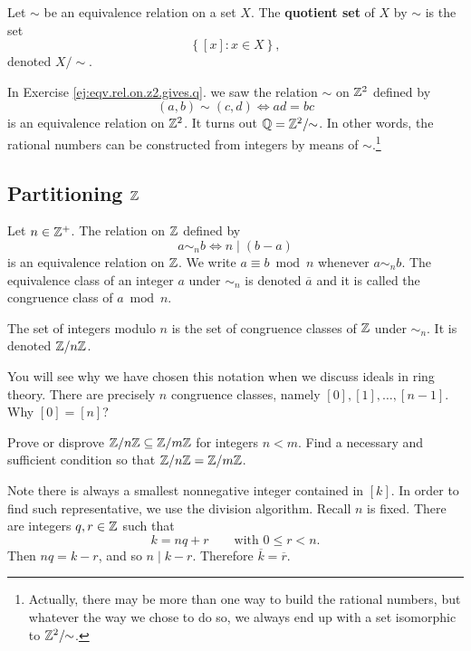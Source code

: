 \documentclass[11pt,a4paper]{article}
\begin{document}
\begin{defi}
    Let \(\sim\) be an equivalence relation on a set \(X\).
    The \textbf{quotient set} of \(X\) by \(\sim\) is the set 
    \[\left\{ [x] : x \in X \right\},\]
    denoted \(X/ \!\!\sim\).

\end{defi}


\begin{exa}
    In Exercise \ref{ej:eqv.rel.on.z2.gives.q}.
    we saw the relation \(\sim\) on \(\mathbb{Z}^2\) defined by 
    \[(a,b) \sim (c,d) \iff ad = bc\]
    is an equivalence relation on \( \mathbb{Z}^2\).
    It turns out 
    \(\mathbb{Q} = \mathbb{Z}^2 / \!\! \sim\).
    In other words, the rational numbers can be constructed from integers by means of \(\sim\).\footnote{Actually, there may be more than one way to build the rational numbers, but whatever the way we chose to do so, we always end up with  a set isomorphic  to \( \mathbb{Z}^2 / \!\! \sim\).}
\end{exa}

\subsection[]{Partitioning \(\mathbb{Z}\)}

Let \(n\in \mathbb{Z}^+\).
The relation  on \(\mathbb{Z}\) defined by 
\[a\sim_n b\iff n\mid (b-a)\]
is an equivalence relation on \(\mathbb{Z}\).
We write \(a \equiv b \bmod n\)
whenever \(a \sim_n b\).
The equivalence class of an integer \(a\) under \(\sim_n\) is denoted \(\overline{a}\) and it is called the congruence class of \(a\bmod n\).

\begin{defi}
    The set of integers modulo \(n\) is the set of congruence classes of \(\mathbb{Z}\) under \(\sim_n\).
    It is denoted \(\mathbb{Z}/ n \mathbb{Z}\).
\end{defi}

You will see why we have chosen this notation when we discuss ideals in ring theory.
There are precisely \(n\) congruence classes,
namely 
\([0],[1],\ldots,[n-1].\)
Why \([0] = [n]\)?

\begin{eje}
    Prove or disprove \(\mathbb{Z}/n\mathbb{Z} \subseteq \mathbb{Z}/m \mathbb{Z}\) for integers \(n< m\).
    Find a necessary and sufficient condition so that \(\mathbb{Z}/n\mathbb{Z} =  \mathbb{Z}/m \mathbb{Z}\).
\end{eje}

Note
there is always  a smallest nonnegative integer contained in \([k]\).
In order to find such representative, we use the division algorithm.
Recall \(n\) is fixed.
There are integers \(q,r\in \mathbb{Z}\) such that 
\[k = nq + r\qquad\text{with } 0\leq r <n.\]
Then \(nq = k-r\), and so \(n \mid k-r\).
Therefore \(\overline{k} = \overline{r}\).
\end{document}
